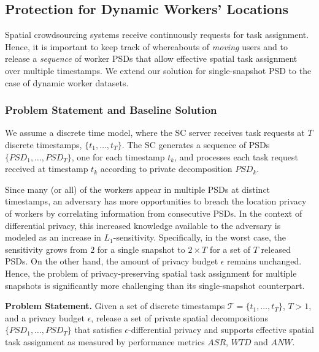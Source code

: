 \documentclass{USC-Thesis}
\renewcommand\bf\bfseries
\numberwithin{equation}{chapter}
\begin{document}
\subsection{Protection for Dynamic Workers' Locations}
\label{sec:psd_dynamic}

Spatial crowdsourcing systems receive continuously requests for task assignment. Hence, it is important to keep track of whereabouts of {\em moving} users and to release a {\em sequence} of worker PSDs that allow effective spatial task assignment over multiple timestamps. We extend our solution for single-snapshot PSD to the case of dynamic worker datasets.

\subsubsection{Problem Statement and Baseline Solution}
We assume a discrete time model, where the SC server receives task requests at $T$ discrete timestamps, $\{t_1, \ldots, t_T\}$. The SC generates a sequence of PSDs $\{PSD_1, \ldots, PSD_T\}$, one for each timestamp $t_k$, and processes each task request received at timestamp $t_k$ according to private decomposition $PSD_k$.

Since many (or all) of the workers appear in multiple PSDs at distinct timestamps, an adversary has more opportunities to breach the location privacy of workers by correlating information from consecutive PSDs. In the context of differential privacy, this increased knowledge available to the adversary is modeled as an increase in $L_1$-sensitivity. Specifically, in the worst case, the sensitivity grows from $2$ for a single snapshot to $2 \times T$ for a set of $T$ released PSDs. On the other hand, the amount of privacy budget $\epsilon$ remains unchanged. Hence, the problem of privacy-preserving spatial task assignment for multiple snapshots is significantly more challenging than its single-snapshot counterpart. 

\noindent
{\bf Problem Statement.} Given a set of discrete timestamps $\mathcal{T} = \{t_1, \ldots, t_T\}$, $T>1$, and a privacy budget $\epsilon$, release a set of private spatial decompositions $\{PSD_1, \ldots, PSD_T\}$ that satisfies $\epsilon$-differential privacy and supports effective spatial task assignment as measured by performance metrics $\mathit{ASR}$, $\mathit{WTD}$ and $\mathit{ANW}$.
\end{document}
